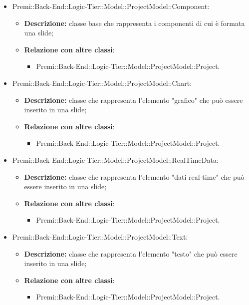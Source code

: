 \begin{itemize}
		\item Premi::Back-End::Logic-Tier::Model::ProjectModel::Component:
		\begin{itemize}
			\item \textbf{Descrizione:} classe base che rappresenta i componenti di cui è formata una slide;
			\item \textbf{Relazione con altre classi}:
			\begin{itemize}
				\item Premi::Back-End::Logic-Tier::Model::ProjectModel::Project.
			\end{itemize}
		\end{itemize}
		
		\item Premi::Back-End::Logic-Tier::Model::ProjectModel::Chart:
		\begin{itemize}
			\item \textbf{Descrizione:} classe che rappresenta l'elemento "grafico" che può essere inserito in una slide;
			\item \textbf{Relazione con altre classi}:
			\begin{itemize}
				\item Premi::Back-End::Logic-Tier::Model::ProjectModel::Project.
			\end{itemize}
		\end{itemize}
		
		\item Premi::Back-End::Logic-Tier::Model::ProjectModel::RealTimeData:
		\begin{itemize}
			\item \textbf{Descrizione:} classe che rappresenta l'elemento "dati real-time" che può essere inserito in una slide;
			\item \textbf{Relazione con altre classi}:
			\begin{itemize}
				\item Premi::Back-End::Logic-Tier::Model::ProjectModel::Project.
			\end{itemize}
		\end{itemize}
		
		\item Premi::Back-End::Logic-Tier::Model::ProjectModel::Text:
		\begin{itemize}
			\item \textbf{Descrizione:} classe che rappresenta l'elemento "testo" che può essere inserito in una slide;
			\item \textbf{Relazione con altre classi}:
			\begin{itemize}
				\item Premi::Back-End::Logic-Tier::Model::ProjectModel::Project.
			\end{itemize}
		\end{itemize}
		

\end{itemize}

